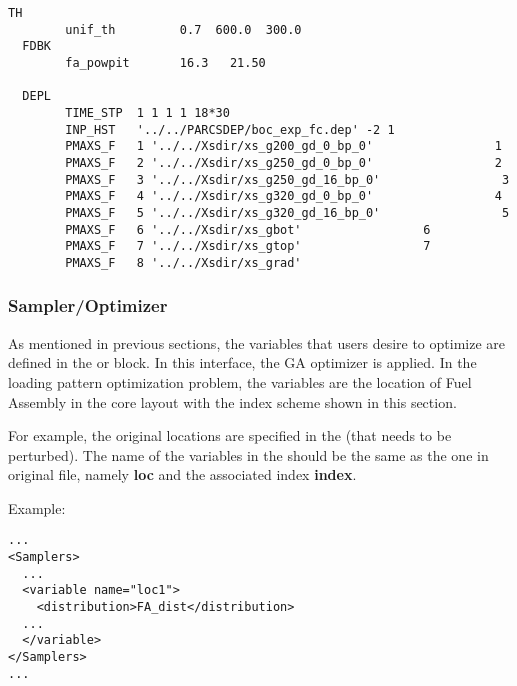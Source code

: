 \begin{lstlisting}[basicstyle=\tiny]
  TH
        unif_th         0.7  600.0  300.0
  FDBK
        fa_powpit       16.3   21.50

  DEPL
        TIME_STP  1 1 1 1 18*30
        INP_HST   '../../PARCSDEP/boc_exp_fc.dep' -2 1
        PMAXS_F   1 '../../Xsdir/xs_g200_gd_0_bp_0'                 1
        PMAXS_F   2 '../../Xsdir/xs_g250_gd_0_bp_0'                 2
        PMAXS_F   3 '../../Xsdir/xs_g250_gd_16_bp_0'                 3
        PMAXS_F   4 '../../Xsdir/xs_g320_gd_0_bp_0'                 4
        PMAXS_F   5 '../../Xsdir/xs_g320_gd_16_bp_0'                 5
        PMAXS_F   6 '../../Xsdir/xs_gbot'                 6
        PMAXS_F   7 '../../Xsdir/xs_gtop'                 7
        PMAXS_F   8 '../../Xsdir/xs_grad'
\end{lstlisting}

\subsubsection{Sampler/Optimizer}
As mentioned in previous sections, the variables that users desire to optimize are defined in
the  or   block. In this interface, the GA optimizer is applied.
In the loading pattern optimization problem, the variables are the location of Fuel Assembly in the core layout
with the index scheme shown in this section.

For example, the original locations are specified in the  (that needs to be perturbed).
The name of the variables in the  should be the same as the one in original 
file, namely \textbf{loc} and the associated index \textbf{index}.

Example:
\begin{lstlisting}[style=XML]
...
<Samplers>
  ...
  <variable name="loc1">
    <distribution>FA_dist</distribution>
  ...
  </variable>
</Samplers>
...
\end{lstlisting}


